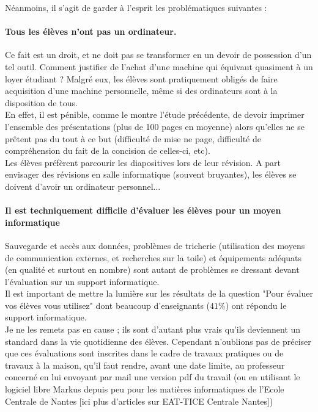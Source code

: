 \documentclass[a4paper,11pt,french]{article}
\begin{document}
Néanmoins, il s'agit de garder à l'esprit les problématiques suivantes :

\paragraph{Tous les élèves n'ont pas un ordinateur.}
Ce fait est un droit, et ne doit pas se transformer en un devoir de possession d'un tel outil. Comment justifier de l'achat d'une machine qui équivaut quasiment à un loyer étudiant ? Malgré eux, les élèves sont pratiquement obligés de faire acquisition d'une machine personnelle, même si des ordinateurs sont à la disposition de tous.\\

En effet, il est pénible, comme le montre l'étude précédente, de devoir imprimer l'ensemble des présentations (plus de 100 pages en moyenne) alors qu'elles ne se prêtent pas du tout à ce but (difficulté de mise ne page, difficulté de compréhension du fait de la concision de celles-ci, etc).\\

Les élèves préfèrent parcourir les diapositives lors de leur révision. A part envisager des révisions en salle informatique (souvent bruyantes), les élèves se doivent d'avoir un ordinateur personnel...\\

\paragraph{Il est techniquement difficile d'évaluer les élèves pour un moyen informatique}
Sauvegarde et accès aux données, problèmes de tricherie (utilisation des moyens de communication externes, et recherches sur la toile) et équipements adéquats (en qualité et surtout en nombre) sont autant de problèmes se dressant devant l'évaluation sur un support informatique.\\

Il est important de mettre la lumière sur les résultats de la question "Pour évaluer vos élèves vous utilisez" dont beaucoup d'enseignants ($41\%$) ont répondu le support informatique.\\

Je ne les remets pas en cause ; ils sont d'autant plus vrais qu'ils deviennent un standard dans la vie quotidienne des élèves. Cependant n'oublions pas de préciser que ces évaluations sont inscrites dans le cadre de travaux pratiques ou de travaux à la maison, qu'il faut rendre, avant une date limite, au professeur concerné en lui envoyant par mail une version pdf du travail (ou en utilisant le logiciel libre Markus depuis peu pour les matières informatiques de l'Ecole Centrale de Nantes [ici plus d'articles sur EAT-TICE Centrale Nantes])\\
\end{document}
